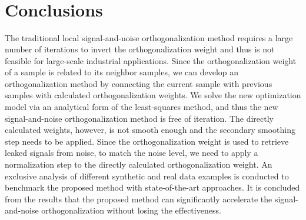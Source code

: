\begin{figure}[htb!]
\centering
{}
\\
\\
\\   
\\    
\caption{}
\label{fig:comp}
\end{figure}




\section{Conclusions}
The traditional local signal-and-noise orthogonalization method requires a large number of iterations to invert the orthogonalization weight and thus is not feasible for large-scale industrial applications. Since the orthogonalization weight of a sample is related to its neighbor samples, we can develop an orthogonalization method by connecting the current sample with previous samples with calculated orthogonalization weights. We solve the new optimization model via an analytical form of the least-squares method, and thus the new signal-and-noise orthogonalization method is free of iteration. The directly calculated weights, however, is not smooth enough and the secondary smoothing step needs to be applied. Since the orthogonalization weight is used to retrieve leaked signals from noise, to match the noise level, we need to apply a normalization step to the directly calculated orthogonalization weight. An exclusive analysis of different synthetic and real data examples is conducted to benchmark the proposed method with state-of-the-art approaches. It is concluded from the results that the proposed method can significantly accelerate the signal-and-noise orthogonalization without losing the effectiveness. 












